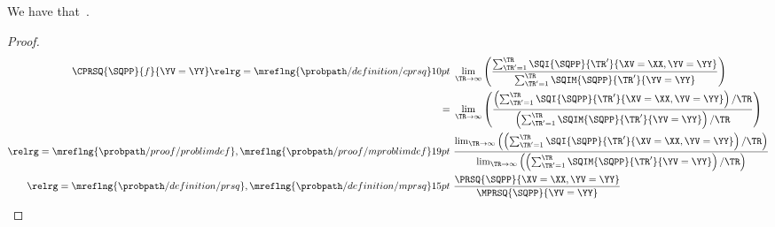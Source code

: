 \begin{proposition}
  We have that\ \cprsqexprprop.%
\end{proposition}

\begin{proof}
  \begin{align*}
    \CPRSQ{\SQPP}{f}{\YV = \YY} 
    \relrg = {\mreflng{\probpath/definition/cprsq}} 10pt \ & 
    \lim_{\TR \rightarrow \infty}
    \left(
    \frac
    {\sum_{\TR' = 1}^{\TR}\SQI{\SQPP}{\TR'}{\XV = \XX, \YV = \YY}}
    {\sum_{\TR' = 1}^{\TR}\SQIM{\SQPP}{\TR'}{\YV = \YY}}
    \right)\\
    = \ &
    \lim_{\TR \rightarrow \infty}
    \left(
    \frac
    {\left({\sum_{\TR' = 1}^{\TR}\SQI{\SQPP}{\TR'}{\XV = \XX, \YV = \YY}}\right)/{\TR}}
    {\left(\sum_{\TR' = 1}^{\TR}\SQIM{\SQPP}{\TR'}{\YV = \YY}\right)/\TR}
    \right)\\
    \relrg = {\mreflng{\probpath/proof/problimdef},\mreflng{\probpath/proof/mproblimdef}} 19pt \ & 
    \frac
    {
      \lim_{\TR \rightarrow \infty}\left(
    \left({\sum_{\TR' = 1}^{\TR}\SQI{\SQPP}{\TR'}{\XV = \XX, \YV = \YY}}\right)/{\TR}\right)}
    {
      \lim_{\TR \rightarrow \infty}\left(
    \left(\sum_{\TR' = 1}^{\TR}\SQIM{\SQPP}{\TR'}{\YV = \YY}\right)/\TR\right)}
    \\
    \relrg = {\mreflng{\probpath/definition/prsq},\mreflng{\probpath/definition/mprsq}} 15pt \ & 
    \frac { \PRSQ{\SQPP}{\XV = \XX, \YV = \YY} } { \MPRSQ{\SQPP}{\YV = \YY} }\\
  \end{align*}
\end{proof}
